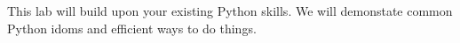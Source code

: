 \label{lab:Essentials3}

This lab will build upon your existing Python skills.  We will demonstate common Python idoms and efficient ways to do things.